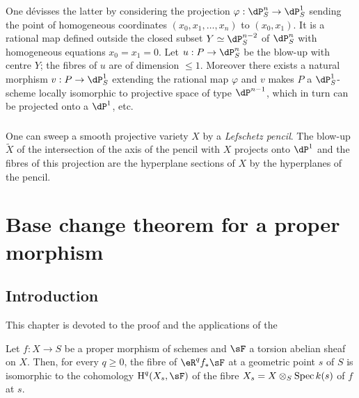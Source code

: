 One d\'evisses the latter by considering the projection
$\varphi:\dP_S^n\to\dP_S^1$ sending the point of homogeneous coordinates
$(x_0,x_1,\dotsc,x_n)$ to $(x_0,x_1)$. It is a rational map
defined outside the closed subset $Y\simeq \dP_S^{n-2}$ of $\dP_S^n$ with
homogeneous equations $x_0=x_1=0$. Let $u:P\to \dP_S^n$ be the blow-up with
centre $Y$; the fibres of $u$ are of dimension $\leqslant 1$. Moreover there exists a
natural morphism $v:P\to \dP_S^1$ extending the rational map
$\varphi$ and $v$ makes $P$ a $\dP_S^1$-scheme locally isomorphic to
projective space of type $\dP^{n-1}$, which in turn can be projected onto a
$\dP^1$, etc. 





\subsubsection{}\label{I:3-4-4}

One can sweep a smooth projective variety $X$ by a \emph{Lefschetz pencil}.
The blow-up $\widetilde X$ of the intersection of the axis of the pencil
with $X$ projects onto $\dP^1$ and the fibres of this projection are the
hyperplane sections of $X$ by the hyperplanes of the pencil.




















\section{Base change theorem for a proper morphism}\label{I:4}










\subsection{Introduction}\label{I:4-1}

This chapter is devoted to the proof and the applications of the 





\begin{theorem}\label{I:4-1-1}
Let $f:X\to S$ be a proper morphism of schemes and $\sF$ a torsion abelian
sheaf on $X$. Then, for every $q\geqslant 0$, the fibre of
$\eR^q f_* \sF$ at a geometric point $s$ of $S$ is isomorphic to the
cohomology $\h^q(X_s,\sF)$ of the fibre $X_s=X\otimes_S \operatorname{Spec} k(s)$ of $f$ at
$s$.
\end{theorem}

